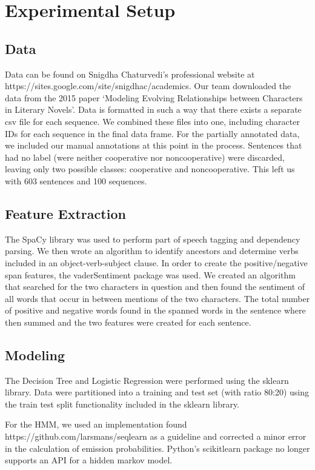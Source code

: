 \documentclass[11pt,a4paper]{article}
\begin{document}
\section{Experimental Setup}

\subsection{Data}
Data can be found on Snigdha Chaturvedi’s professional website at https://sites.google.com/site/snigdhac/academics. Our team downloaded the data from the 2015 paper ‘Modeling Evolving Relationships between Characters in Literary Novels’. Data is formatted in such a way that there exists a separate csv file for each sequence. We combined these files into one, including character IDs for each sequence in the final data frame. For the partially annotated data, we included our manual annotations at this point in the process. Sentences that had no label (were neither cooperative nor noncooperative) were discarded, leaving only two possible classes: cooperative and noncooperative. This left us with 603 sentences and 100 sequences. 

\subsection{Feature Extraction}
The SpaCy library was used to perform part of speech tagging and dependency parsing. We then wrote an algorithm to identify ancestors and determine verbs included in an object-verb-subject clause. 
In order to create the positive/negative span features, the vaderSentiment package was used. We created an algorithm that searched for the two characters in question and then found the sentiment of all words that occur in between mentions of the two characters. The total number of positive and negative words found in the spanned words in the sentence where then summed and the two features were created for each sentence.

\subsection{Modeling}
The Decision Tree and Logistic Regression were performed using the sklearn library. Data were partitioned into a training and test set (with ratio 80:20) using the train test split functionality included in the sklearn library. 

For the HMM, we used an implementation found https://github.com/larsmans/seqlearn as a guideline and corrected a minor error in the calculation of emission probabilities. Python's scikitlearn package no longer supports an API for a hidden markov model. 
\end{document}
